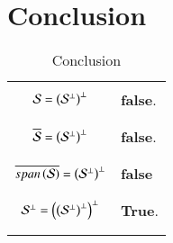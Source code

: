 \documentclass[journal,12pt]{IEEEtran}
\begin{document}
\section{\textbf{Conclusion}}
\renewcommand{\thetable}{2}
\begin{longtable}{|c|l|}
    \hline
	\multirow{3}{*}{$\mathcal{S}=\left(\mathcal{S}^{\perp}\right)^{\perp}$} 
	& \\
	&\textbf{false}.\\
	&\\
	\hline
    \multirow{3}{*}{$\overline{\mathcal{S}}=\left(\mathcal{S}^{\perp}\right)^{\perp}$} 
	& \\
	&\textbf{false}.\\
	&\\
	\hline
	\multirow{3}{*}{$\overline{span\left(\mathcal{S}\right)}=\left(\mathcal{S}^{\perp}\right)^{\perp}$}
	&\\
	&\textbf{false}\\
	&\\
	\hline
	\multirow{3}{*}{$\mathcal{S}^{\perp}=\left(\left(\mathcal{S}^{\perp}\right)^{\perp}\right)^{\perp}$}
	& \\
    &\textbf{True}.\\
	&\\
	\hline
	\caption{Conclusion}
    \label{table:3}
\end{longtable}
\end{document}
